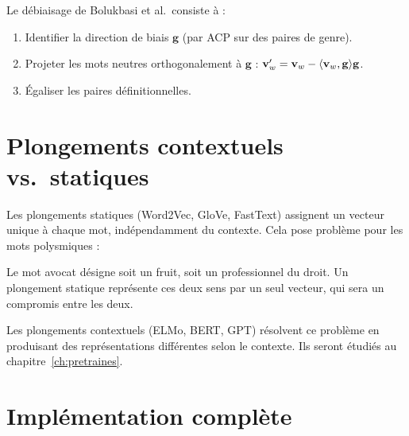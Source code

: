 \begin{definition}
Le d\'ebiaisage de Bolukbasi et al.\ consiste \`a :
\begin{enumerate}
    \item Identifier la direction de biais $\mathbf{g}$ (par ACP sur des paires
          de genre).
    \item Projeter les mots neutres orthogonalement \`a $\mathbf{g}$ :
          $\mathbf{v}_w' = \mathbf{v}_w - \langle \mathbf{v}_w, \mathbf{g} \rangle \mathbf{g}$.
    \item \'Egaliser les paires d\'efinitionnelles.
\end{enumerate}
\end{definition}

\section{Plongements contextuels vs.\ statiques}
\label{sec:plg:contextuels}

Les plongements statiques (Word2Vec, GloVe, FastText) assignent un vecteur
unique \`a chaque mot, ind\'ependamment du contexte. Cela pose probl\`eme
pour les mots polysmiques :

\begin{exemple}
Le mot \og avocat \fg d\'esigne soit un fruit, soit un professionnel du
droit. Un plongement statique repr\'esente ces deux sens par un seul vecteur,
qui sera un compromis entre les deux.
\end{exemple}

Les plongements contextuels (ELMo, BERT, GPT) r\'esolvent ce probl\`eme en
produisant des repr\'esentations diff\'erentes selon le contexte. Ils seront
\'etudi\'es au chapitre~\ref{ch:pretraines}.

\section{Impl\'ementation compl\`ete}
\label{sec:plg:implementation}

